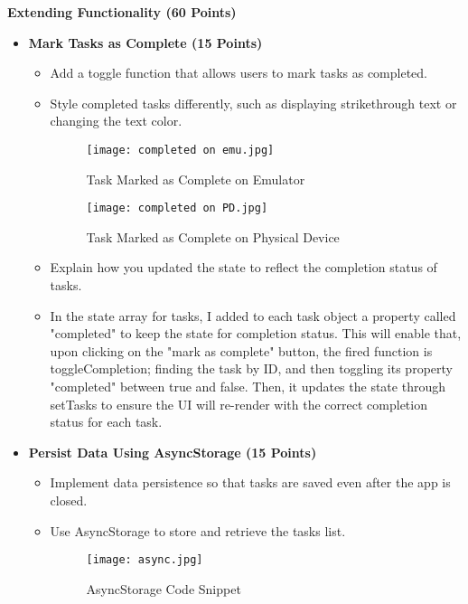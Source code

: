 \documentclass{article}
\begin{document}
\textbf{Extending Functionality (60 Points)}
\begin{itemize}
    \item \textbf{Mark Tasks as Complete (15 Points)}
    \begin{itemize}
        \item Add a toggle function that allows users to mark tasks as completed.
        \item Style completed tasks differently, such as displaying strikethrough text or changing the text color.
        \begin{figure}[H]
            \centering
            \texttt{[image: completed on emu.jpg]}
            \caption{Task Marked as Complete on Emulator}
        \end{figure}
        \begin{figure}[H]
            \centering
            \texttt{[image: completed on PD.jpg]}
            \caption{Task Marked as Complete on Physical Device}
        \end{figure}
        \item Explain how you updated the state to reflect the completion status of tasks.
        \item In the state array for tasks, I added to each task object a property called "completed" to keep the state for completion status. This will enable that, upon clicking on the "mark as complete" button, the fired function is toggleCompletion; finding the task by ID, and then toggling its property "completed" between true and false. Then, it updates the state through setTasks to ensure the UI will re-render with the correct completion status for each task.
    \end{itemize}
    
    \item \textbf{Persist Data Using AsyncStorage (15 Points)}
    \begin{itemize}
        \item Implement data persistence so that tasks are saved even after the app is closed.
        \item Use AsyncStorage to store and retrieve the tasks list.
        \begin{figure}[H]
            \centering
            \texttt{[image: async.jpg]}
            \caption{AsyncStorage Code Snippet}
        \end{figure}
    \end{itemize}
    

\end{itemize}
\end{document}
